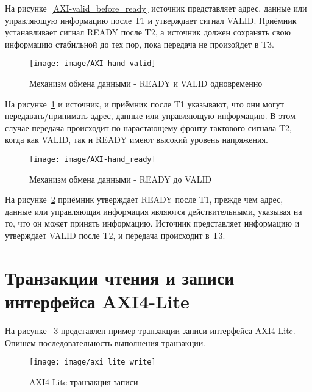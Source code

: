 На рисунке~\ref{AXI-valid_before_ready} источник представляет адрес, данные или управляющую информацию после T1 и утверждает сигнал VALID. Приёмник устанавливает сигнал READY после T2, а источник должен сохранять свою информацию стабильной до тех пор, пока передача не произойдет в T3.


\begin{figure}[!ht]
	\centering
	\texttt{[image: image/AXI-hand-valid]}
	\caption{Механизм обмена данными - READY и VALID одновременно}
	\label{AXI-valid_ready}
\end{figure}


На рисунке~\ref{AXI-valid_ready} и источник, и приёмник после T1 указывают, что они могут передавать/принимать адрес, данные или управляющую информацию. В этом случае передача происходит по нарастающему фронту тактового сигнала T2, когда как VALID, так и READY имеют высокий уровень напряжения.

\begin{figure}[!ht]
	\centering
	\texttt{[image: image/AXI-hand\_ready]}
	\caption{Механизм обмена данными - READY до VALID}
	\label{AXI-handshape}
\end{figure}

На рисунке~\ref{AXI-handshape} приёмник утверждает READY после T1, прежде чем адрес, данные или управляющая информация являются действительными, указывая на то, что он может принять информацию. Источник представляет информацию и утверждает VALID после T2, и передача происходит в T3.

\section{Транзакции чтения и записи интерфейса AXI4-Lite}

На рисунке ~\ref{AXI_wr_tr} представлен пример транзакции записи интерфейса AXI4-Lite.
Опишем последовательность выполнения транзакции.

\begin{figure}[h]
	\centering
	\texttt{[image: image/axi\_lite\_write]}
	\caption{AXI4-Lite транзакция записи}
	\label{AXI_wr_tr}
\end{figure}


